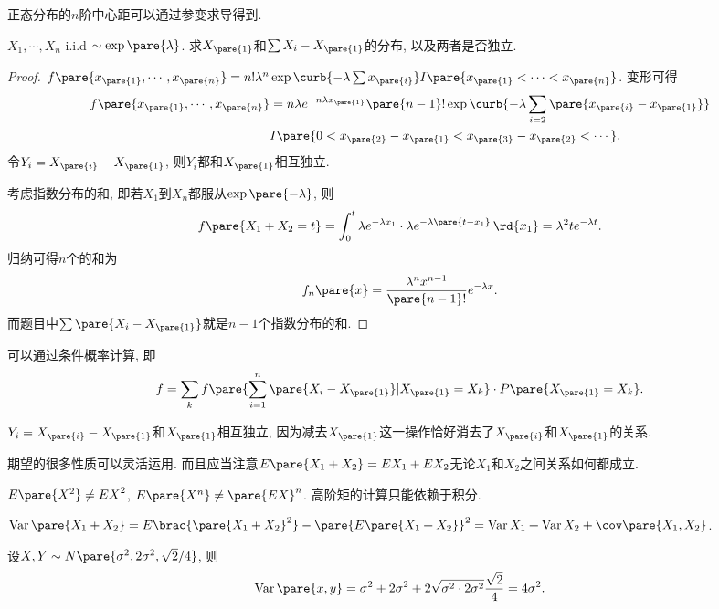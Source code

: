\documentclass{ctexart}
\DeclareMathOperator{\Var}{Var}
\begin{document}
\begin{remark}
    正态分布的$n$阶中心距可以通过参变求导得到.
\end{remark}
\begin{ex}
    $X_1, \cdots, X_n$ i.i.d $\sim \exp\pare{\lambda}$. 求$X_{\pare{1}}$和$\sum X_i - X_{\pare{1}}$的分布, 以及两者是否独立.
\end{ex}
\begin{proof}
    $f\pare{x_{\pare{1}}, \cdots, x_{\pare{n}}} = n! \lambda^n \exp\curb{-\lambda \sum x_{\pare{i}}} I\pare{x_{\pare{1}}< \cdots < x_{\pare{n}}}$. 变形可得
    \begin{align*}
        f\pare{x_{\pare{1}}, \cdots, x_{\pare{n}}} &= n\lambda e^{-n\lambda x_{\pare{1}}} \pare{n-1}! \exp\curb{-\lambda \sum_{i=2} \pare{x_{\pare{i}} - x_{\pare{1}}}}\\ & I\pare{0 < x_{\pare{2}} - x_{\pare{1}} < x_{\pare{3}} - x_{\pare{2}} < \cdots}. 
    \end{align*}
    令$Y_i = X_{\pare{i}} - X_{\pare{1}}$, 则$Y_i$都和$X_{\pare{1}}$相互独立.
    \par
    考虑指数分布的和, 即若$X_1$到$X_n$都服从$\exp\pare{-\lambda}$, 则
    \[ f\pare{X_1+X_2 = t} = \int_0^t \lambda e^{-\lambda x_1} \cdot \lambda e^{-\lambda\pare{t-x_1}}\,\rd{x_1} = \lambda^2 te^{-\lambda t}. \]
    归纳可得$n$个的和为
    \[ f_n\pare{x} = \frac{\lambda^n x^{n-1}}{\pare{n-1}!} e^{-\lambda x}. \]
    而题目中$\sum \pare{X_i - X_{\pare{1}}}$就是$n-1$个指数分布的和.
\end{proof}
\begin{remark}
    可以通过条件概率计算, 即
    \[ f = \sum_k f\pare{\sum_{i=1}^n \pare{X_i - X_{\pare{1}}}\vert X_{\pare{1}} = X_k}\cdot P\pare{X_{\pare{1}} = X_k}. \]
\end{remark}
\begin{remark}
    $Y_i = X_{\pare{i}} - X_{\pare{1}}$和$X_{\pare{1}}$相互独立, 因为减去$X_{\pare{1}}$这一操作恰好消去了$X_{\pare{i}}$和$X_{\pare{1}}$的关系.
\end{remark}
期望的很多性质可以灵活运用. 而且应当注意$E\pare{X_1 + X_2} = EX_1 + EX_2$无论$X_1$和$X_2$之间关系如何都成立.
\begin{pitfall}
    $E\pare{X^2} \neq {EX}^2$, $E\pare{X^n} \neq \pare{EX}^n$. 高阶矩的计算只能依赖于积分.
\end{pitfall}
$\Var\pare{X_1+X_2} = E\brac{\pare{X_1+X_2}^2} - \pare{E\pare{X_1 + X_2}}^2 = \Var X_1 + \Var X_2 + \cov\pare{X_1, X_2}$.
\begin{ex}
    设$X,Y\sim N\pare{\sigma^2, 2\sigma^2, \sqrt{2}/4}$, 则
    \[ \Var\pare{x,y} = \sigma^2 + 2\sigma^2 + 2\sqrt{\sigma^2 \cdot 2\sigma^2} \frac{\sqrt{2}}{4} = 4\sigma^2. \]
\end{ex}
\end{document}
